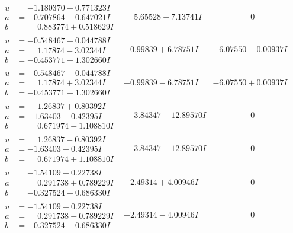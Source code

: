\documentclass[1p]{elsarticle_modified}
\theoremstyle{definition}
\begin{document}
$$\begin{array}{c|c|c}
\begin{aligned}
u &= -1.180370 - 0.771323 I \\
a &= -0.707864 - 0.647021 I \\
b &= \phantom{-}0.883774 + 0.518629 I\end{aligned}
 & \phantom{-}5.65528 - 7.13741 I & \phantom{-0.000000 } 0 \\ \hline\begin{aligned}
u &= -0.548467 + 0.044788 I \\
a &= \phantom{-}1.17874 - 3.02344 I \\
b &= -0.453771 - 1.302660 I\end{aligned}
 & -0.99839 + 6.78751 I & -6.07550 - 0.00937 I \\ \hline\begin{aligned}
u &= -0.548467 - 0.044788 I \\
a &= \phantom{-}1.17874 + 3.02344 I \\
b &= -0.453771 + 1.302660 I\end{aligned}
 & -0.99839 - 6.78751 I & -6.07550 + 0.00937 I \\ \hline\begin{aligned}
u &= \phantom{-}1.26837 + 0.80392 I \\
a &= -1.63403 - 0.42395 I \\
b &= \phantom{-}0.671974 - 1.108810 I\end{aligned}
 & \phantom{-}3.84347 - 12.89570 I & \phantom{-0.000000 } 0 \\ \hline\begin{aligned}
u &= \phantom{-}1.26837 - 0.80392 I \\
a &= -1.63403 + 0.42395 I \\
b &= \phantom{-}0.671974 + 1.108810 I\end{aligned}
 & \phantom{-}3.84347 + 12.89570 I & \phantom{-0.000000 } 0 \\ \hline\begin{aligned}
u &= -1.54109 + 0.22738 I \\
a &= \phantom{-}0.291738 + 0.789229 I \\
b &= -0.327524 + 0.686330 I\end{aligned}
 & -2.49314 + 4.00946 I & \phantom{-0.000000 } 0 \\ \hline\begin{aligned}
u &= -1.54109 - 0.22738 I \\
a &= \phantom{-}0.291738 - 0.789229 I \\
b &= -0.327524 - 0.686330 I\end{aligned}
 & -2.49314 - 4.00946 I & \phantom{-0.000000 } 0\\

\end{array}$$
\end{document}
